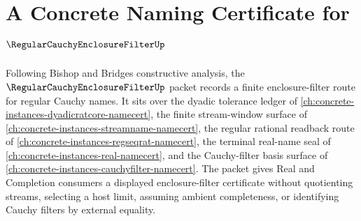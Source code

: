 \chapter{A Concrete Naming Certificate for $\RegularCauchyEnclosureFilterUp$}
\label{ch:concrete-instances-regular-cauchy-enclosure-filter-namecert}

Following Bishop and Bridges constructive analysis, the $\RegularCauchyEnclosureFilterUp$ packet records a finite enclosure-filter route for regular Cauchy names. It sits over the dyadic tolerance ledger of \autoref{ch:concrete-instances-dyadicratcore-namecert}, the finite stream-window surface of \autoref{ch:concrete-instances-streamname-namecert}, the regular rational readback route of \autoref{ch:concrete-instances-regseqrat-namecert}, the terminal real-name seal of \autoref{ch:concrete-instances-real-namecert}, and the Cauchy-filter basis surface of \autoref{ch:concrete-instances-cauchyfilter-namecert}. The packet gives Real and Completion consumers a displayed enclosure-filter certificate without quotienting streams, selecting a host limit, assuming ambient completeness, or identifying Cauchy filters by external equality.

